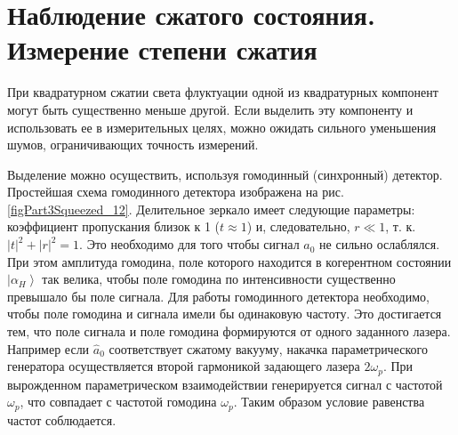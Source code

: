 \section{Наблюдение сжатого состояния. Измерение степени сжатия}

При квадратурном сжатии света флуктуации одной из квадратурных
компонент могут быть существенно меньше другой. Если выделить эту
компоненту и использовать ее в измерительных целях, можно ожидать
сильного уменьшения шумов, ограничивающих точность измерений. 



Выделение можно осуществить, используя гомодинный (синхронный)
детектор. Простейшая схема гомодинного детектора изображена на
рис. \ref{figPart3Squeezed_12}. Делительное зеркало имеет следующие
параметры: коэффициент пропускания близок к 1 ($t \approx 1$) и,
следовательно, $r \ll 1$, т. к. $\left|t\right|^2 +\left|r\right|^2 =
1$. Это необходимо для того чтобы сигнал $\hat{a}_0$ не сильно
ослаблялся. При этом амплитуда гомодина, поле которого находится в
когерентном состоянии $\left|\alpha_{H}\right>$ так велика, чтобы поле
гомодина по интенсивности существенно превышало бы поле сигнала. Для
работы гомодинного детектора необходимо, чтобы поле гомодина и сигнала
имели бы одинаковую частоту. Это достигается тем, что поле сигнала и
поле гомодина формируются от одного заданного лазера. Например если
$\hat{a}_0$ соответствует сжатому вакууму, накачка параметрического
генератора осуществляется второй гармоникой задающего лазера $2
\omega_p$. При вырожденном параметрическом взаимодействии генерируется
сигнал с частотой $\omega_p$, что совпадает с частотой гомодина
$\omega_p$. Таким образом условие равенства частот соблюдается.

